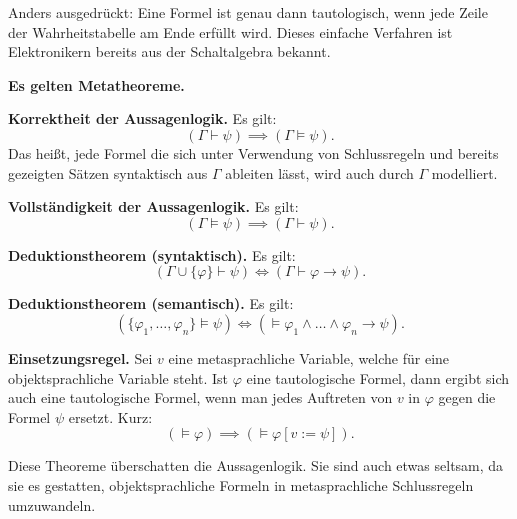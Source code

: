 \documentclass{beamer}
\newcommand{\strong}[1]{\textsf{\textbf{#1}}}
\begin{document}
\begin{frame}
Anders ausgedrückt: Eine Formel ist genau dann tautologisch,
wenn jede Zeile der Wahrheitstabelle am Ende erfüllt wird.
Dieses einfache Verfahren ist Elektronikern bereits aus der
Schaltalgebra bekannt.
\end{frame}

\begin{frame}
\strong{Es gelten Metatheoreme.}
\end{frame}

\begin{frame}
\strong{Korrektheit der Aussagenlogik.}
Es gilt:
\[(\Gamma\vdash\psi)\implies (\Gamma\models\psi).\]
Das heißt, jede Formel die sich unter Verwendung von
Schlussregeln und bereits gezeigten Sätzen syntaktisch aus $\Gamma$
ableiten lässt, wird auch durch $\Gamma$ modelliert.
\end{frame}

\begin{frame}
\strong{Vollständigkeit der Aussagenlogik.}
Es gilt:
\[(\Gamma\models\psi)\implies (\Gamma\vdash\psi).\]
\end{frame}

\begin{frame}
\strong{Deduktionstheorem (syntaktisch).}
Es gilt:
\[(\Gamma\cup\{\varphi\}\vdash\psi)
\iff(\Gamma\vdash\varphi\rightarrow\psi).\]
\end{frame}

\begin{frame}
\strong{Deduktionstheorem (semantisch).}
Es gilt:
\[(\{\varphi_1,\ldots,\varphi_n\}\models\psi)
\iff (\models\varphi_1\land\ldots\land\varphi_n\rightarrow\psi).\]
\end{frame}

\begin{frame}
\strong{Einsetzungsregel.} Sei $v$ eine metasprachliche Variable,
welche für eine objektsprachliche Variable steht. Ist $\varphi$
eine tautologische Formel, dann ergibt sich auch eine tautologische
Formel, wenn man jedes Auftreten von $v$ in $\varphi$ gegen die
Formel $\psi$ ersetzt. Kurz:
\[(\models\varphi)\implies (\models\varphi[v:=\psi]).\]
\end{frame}

\begin{frame}
Diese Theoreme überschatten die Aussagenlogik. Sie sind auch etwas
seltsam, da sie es gestatten, objektsprachliche Formeln in
metasprachliche Schlussregeln umzuwandeln.
\end{frame}
\end{document}
